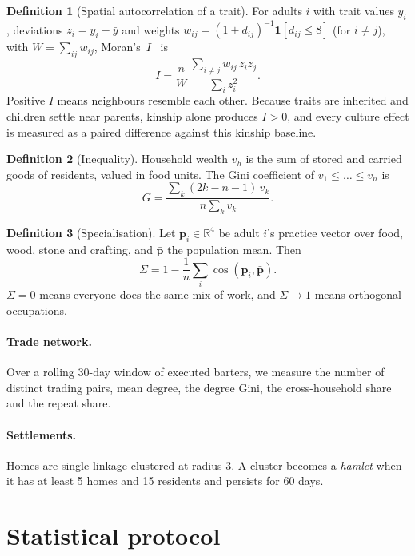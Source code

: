 \documentclass[11pt]{article}
\theoremstyle{definition}
\newtheorem{definition}{Definition}
\newcommand{\1}{\mathbf{1}}
\begin{document}
\begin{definition}[Spatial autocorrelation of a trait]
For adults $i$ with trait values $y_i$, deviations $z_i=y_i-\bar y$ and weights $w_{ij} = (1+d_{ij})^{-1}\1[d_{ij}\le 8]$ (for $i\ne j$), with $W=\sum_{ij}w_{ij}$, Moran's~$I$~\cite{moran1950} is
\[I = \frac{n}{W}\,\frac{\sum_{i\neq j} w_{ij}\,z_iz_j}{\sum_i z_i^2}.\]
Positive $I$ means neighbours resemble each other. Because traits are inherited and children settle near parents, kinship alone produces $I>0$, and every culture effect is measured as a paired difference against this kinship baseline.
\end{definition}

\begin{definition}[Inequality]
Household wealth $v_h$ is the sum of stored and carried goods of residents, valued in food units. The Gini coefficient of $v_1\le\dots\le v_n$ is
\[G = \frac{\sum_{k}(2k-n-1)\,v_k}{n\sum_k v_k}.\]
\end{definition}

\begin{definition}[Specialisation]
Let $\mathbf{p}_i\in\mathbb{R}^4$ be adult $i$'s practice vector over food, wood, stone and crafting, and $\bar{\mathbf{p}}$ the population mean. Then
\[\Sigma = 1 - \frac1n\sum_i \cos(\mathbf{p}_i,\bar{\mathbf{p}}).\]
$\Sigma=0$ means everyone does the same mix of work, and $\Sigma\to1$ means orthogonal occupations.
\end{definition}

\paragraph{Trade network.} Over a rolling 30-day window of executed barters, we measure the number of distinct trading pairs, mean degree, the degree Gini, the cross-household share and the repeat share.

\paragraph{Settlements.} Homes are single-linkage clustered at radius 3. A cluster becomes a \emph{hamlet} when it has at least 5 homes and 15 residents and persists for 60 days.

\section{Statistical protocol}\label{sec:stats}
\end{document}
